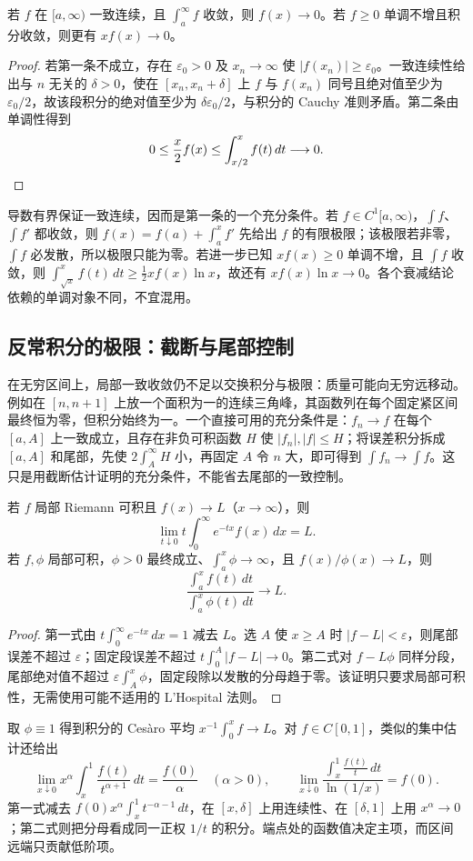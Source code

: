 \begin{theorem}
\label{thm:pei-int-integral-decay}
若 $f$ 在 $[a,\infty)$ 一致连续，且 $\int_a^\infty f$ 收敛，则 $f(x)\to0$。若 $f\ge0$ 单调不增且积分收敛，则更有 $xf(x)\to0$。
\end{theorem}
\begin{proof}
若第一条不成立，存在 $\varepsilon_0>0$ 及 $x_n\to\infty$ 使 $|f(x_n)|\ge\varepsilon_0$。一致连续性给出与 $n$ 无关的 $\delta>0$，使在 $[x_n,x_n+\delta]$ 上 $f$ 与 $f(x_n)$ 同号且绝对值至少为 $\varepsilon_0/2$，故该段积分的绝对值至少为 $\delta\varepsilon_0/2$，与积分的 Cauchy 准则矛盾。第二条由单调性得到
\[
 0\le\frac x2f(x)\le\int_{x/2}^xf(t)\,dt\longrightarrow0.
 \qedhere
\]
\end{proof}
导数有界保证一致连续，因而是第一条的一个充分条件。若 $f\in C^1[a,\infty)$，$\int f$、$\int f'$ 都收敛，则 $f(x)=f(a)+\int_a^xf'$ 先给出 $f$ 的有限极限；该极限若非零，$\int f$ 必发散，所以极限只能为零。若进一步已知 $xf(x)\ge0$ 单调不增，且 $\int f$ 收敛，则 $\int_{\sqrt x}^xf(t)\,dt\ge\tfrac12xf(x)\ln x$，故还有 $xf(x)\ln x\to0$。各个衰减结论依赖的单调对象不同，不宜混用。

\subsection{反常积分的极限：截断与尾部控制}
在无穷区间上，局部一致收敛仍不足以交换积分与极限：质量可能向无穷远移动。例如在 $[n,n+1]$ 上放一个面积为一的连续三角峰，其函数列在每个固定紧区间最终恒为零，但积分始终为一。一个直接可用的充分条件是：$f_n\to f$ 在每个 $[a,A]$ 上一致成立，且存在非负可积函数 $H$ 使 $|f_n|,|f|\le H$；将误差积分拆成 $[a,A]$ 和尾部，先使 $2\int_A^\infty H$ 小，再固定 $A$ 令 $n$ 大，即可得到 $\int f_n\to\int f$。这只是用截断估计证明的充分条件，不能省去尾部的一致控制。

\begin{proposition}
\label{prop:pei-int-abel-average}
若 $f$ 局部 Riemann 可积且 $f(x)\to L$（$x\to\infty$），则
\[
 \lim_{t\downarrow0}t\int_0^\infty e^{-tx}f(x)\,dx=L.
\]
若 $f,\phi$ 局部可积，$\phi>0$ 最终成立、$\int_a^x\phi\to\infty$，且 $f(x)/\phi(x)\to L$，则
\[
 \frac{\int_a^xf(t)\,dt}{\int_a^x\phi(t)\,dt}\longrightarrow L.
\]
\end{proposition}
\begin{proof}
第一式由 $t\int_0^\infty e^{-tx}\,dx=1$ 减去 $L$。选 $A$ 使 $x\ge A$ 时 $|f-L|<\varepsilon$，则尾部误差不超过 $\varepsilon$；固定段误差不超过 $t\int_0^A|f-L|\to0$。第二式对 $f-L\phi$ 同样分段，尾部绝对值不超过 $\varepsilon\int_A^x\phi$，固定段除以发散的分母趋于零。该证明只要求局部可积性，无需使用可能不适用的 L'Hospital 法则。
\end{proof}
取 $\phi\equiv1$ 得到积分的 Cesàro 平均 $x^{-1}\int_0^xf\to L$。对 $f\in C[0,1]$，类似的集中估计还给出
\[
 \lim_{x\downarrow0}x^\alpha\int_x^1\frac{f(t)}{t^{\alpha+1}}\,dt=\frac{f(0)}\alpha\quad(\alpha>0),
 \qquad
 \lim_{x\downarrow0}\frac{\int_x^1\frac{f(t)}t\,dt}{\ln(1/x)}=f(0).
\]
第一式减去 $f(0)x^\alpha\int_x^1t^{-\alpha-1}\,dt$，在 $[x,\delta]$ 上用连续性、在 $[\delta,1]$ 上用 $x^\alpha\to0$；第二式则把分母看成同一正权 $1/t$ 的积分。端点处的函数值决定主项，而区间远端只贡献低阶项。

